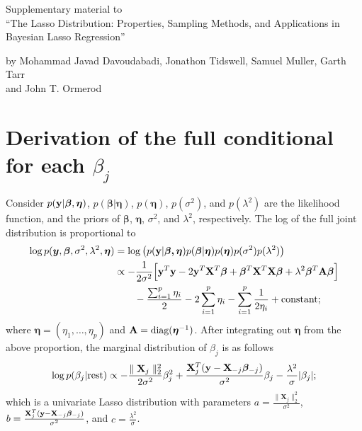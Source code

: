 \documentclass[11pt]{article}
\newcommand{\vy}{\boldsymbol{y}}
\newcommand{\veta}{\boldsymbol{\eta}}
\begin{document}
\begin{center}
{\Large
Supplementary material to \\ ``The Lasso Distribution: Properties, Sampling Methods, and Applications in Bayesian Lasso Regression''}

\bigskip 

 
by Mohammad Javad Davoudabadi, Jonathon Tidswell, Samuel Muller,  Garth Tarr \\ and John T. Ormerod
 

\bigskip 
\date{\today}
\end{center}

\appendix

\section{Derivation of the full conditional for each $\beta_j$}\label{Suppl:derivation_fullConditional_Dist}
Consider $p({\bf y}| \boldsymbol{\beta}, {\veta})$, $p(\boldsymbol{\beta}| {\veta})$, $p({\veta})$, $p(\sigma^2)$, and $p(\lambda^2)$ are the likelihood function, and the priors of $\boldsymbol{\beta}$, ${\veta}$, $\sigma^2$, and $\lambda^2$, respectively. The log of the full joint distribution is proportional to
\begin{align*}
    \log p(\vy, \boldsymbol{\beta}, \sigma^2, \lambda^2,
{\veta}) & = \log \big(p({\bf y}| \boldsymbol{\beta,{\veta}})p(\boldsymbol{\beta}|{\veta})p({\veta})p(\sigma^2)p(\lambda^2) \big)\\ &
\propto - \frac{1}{2\sigma^2} \Big[ {\bf y}^T{\bf y} - 2{\bf y}^T \mathbf{X}^T \boldsymbol{\beta} + \boldsymbol{\beta}^T \mathbf{X}^T \mathbf{X} \boldsymbol{\beta} + \lambda^2 \boldsymbol{\beta}^T{\bf A}\boldsymbol{\beta} \Big]  \\ 
& \quad\quad{}- \frac{\sum_{i=1}^p \eta_i}{2} - 2\sum_{i=1}^p \eta_i - \sum_{i=1}^p\frac{1}{2\eta_i} + \mbox{constant}; 
\end{align*}
where ${\veta}= (\eta_1,\ldots,\eta_p)$ and ${\bf A}= \text{diag}({\veta}^{-1})$. After integrating out ${\veta}$ from the above proportion, the marginal distribution of $\beta_j$ is as follows
\begin{align*}
    \log p(\beta_j| \text{rest}) \propto - \frac{\parallel  \mathbf{X}_j\parallel^2_2}{2\sigma^2}\beta_j^2 + \frac{\mathbf{X}_j^T({\bf y} - \mathbf{X}_{-j}\boldsymbol{\beta}_{-j})}{\sigma^2} \beta_j - \frac{\lambda^2}{\sigma} |\beta_j|;
\end{align*}
which is a univariate Lasso distribution with parameters $a = \frac{\parallel  \mathbf{X}_j\parallel^2_2}{\sigma^2}$, $b = \frac{\mathbf{X}_j^T({\bf y} - \mathbf{X}_{-j}\boldsymbol{\beta}_{-j})}{\sigma^2}$, and $c = \frac{\lambda^2}{\sigma}$.
\end{document}
